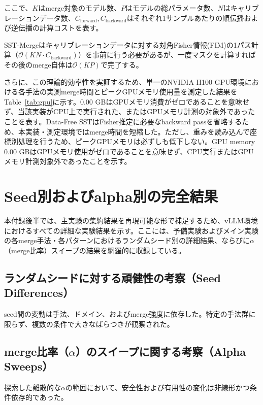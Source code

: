 \documentclass{article}
\begin{document}
ここで、$K$はmerge対象のモデル数、$P$はモデルの総パラメータ数、$N$はキャリブレーションデータ数、$C_{\text{forward}},C_{\text{backward}}$はそれぞれ1サンプルあたりの順伝播および逆伝播の計算コストを表す。

SST-Mergeはキャリブレーションデータに対する対角Fisher情報(FIM)の1パス計算（$\mathcal{O}(KN \cdot C_{\text{backward}})$）を事前に行う必要があるが、一度マスクを計算すればその後のmerge自体は$\mathcal{O}(KP)$で完了する。

さらに、この理論的効率性を実証するため、単一のNVIDIA H100 GPU環境における各手法の実測merge時間とピークGPUメモリ使用量を測定した結果をTable~\ref{tab:gpu}に示す。0.00 GBはGPUメモリ消費がゼロであることを意味せず、当該実装がCPU上で実行された、またはGPUメモリ計測の対象外であったことを表す。Data-Free SSTはFisher推定に必要なbackward passを省略するため、本実装・測定環境ではmerge時間を短縮した。ただし、重みを読み込んで座標別処理を行うため、ピークGPUメモリは必ずしも低下しない。GPU memory 0.00 GBはGPUメモリ使用がゼロであることを意味せず、CPU実行またはGPUメモリ計測対象外であったことを示す。



\FloatBarrier

\section{Seed別およびalpha別の完全結果}
\label{sec:appendix_detailed_results}

本付録後半では、主実験の集約結果を再現可能な形で補足するため、vLLM環境におけるすべての詳細な実験結果を示す。ここには、予備実験およびメイン実験の各merge手法・各パターンにおけるランダムシード別の詳細結果、ならびに$\alpha$（merge比率）スイープの結果を網羅的に収録している。

\subsection{ランダムシードに対する頑健性の考察（Seed Differences）}
seed間の変動は手法、ドメイン、およびmerge強度に依存した。特定の手法群に限らず、複数の条件で大きなばらつきが観察された。

\subsection{merge比率（$\alpha$）のスイープに関する考察（Alpha Sweeps）}
探索した離散的な\(\alpha\)の範囲において、安全性および有用性の変化は非線形かつ条件依存的であった。
\end{document}
